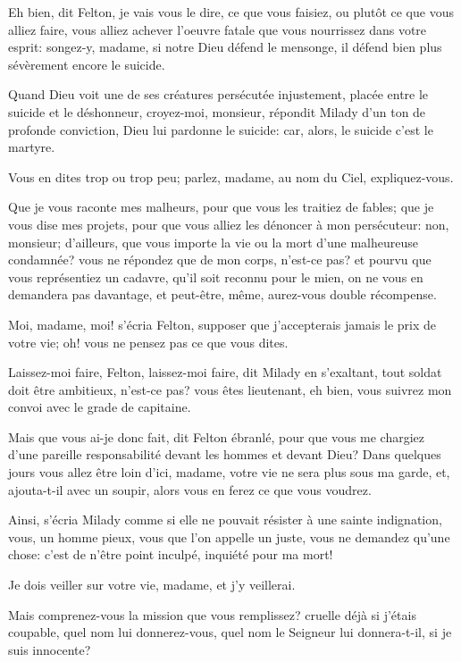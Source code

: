 \speak  Eh bien, dit Felton, je vais vous le dire, ce que vous faisiez, ou plutôt ce que vous alliez faire, vous alliez achever l'oeuvre fatale que vous nourrissez dans votre esprit: songez-y, madame, si notre Dieu défend le mensonge, il défend bien plus sévèrement encore le suicide. 

\speak  Quand Dieu voit une de ses créatures persécutée injustement, placée entre le suicide et le déshonneur, croyez-moi, monsieur, répondit Milady d'un ton de profonde conviction, Dieu lui pardonne le suicide: car, alors, le suicide c'est le martyre. 

\speak  Vous en dites trop ou trop peu; parlez, madame, au nom du Ciel, expliquez-vous. 

\speak  Que je vous raconte mes malheurs, pour que vous les traitiez de fables; que je vous dise mes projets, pour que vous alliez les dénoncer à mon persécuteur: non, monsieur; d'ailleurs, que vous importe la vie ou la mort d'une malheureuse condamnée? vous ne répondez que de mon corps, n'est-ce pas? et pourvu que vous représentiez un cadavre, qu'il soit reconnu pour le mien, on ne vous en demandera pas davantage, et peut-être, même, aurez-vous double récompense. 

\speak  Moi, madame, moi! s'écria Felton, supposer que j'accepterais jamais le prix de votre vie; oh! vous ne pensez pas ce que vous dites. 

\speak  Laissez-moi faire, Felton, laissez-moi faire, dit Milady en s'exaltant, tout soldat doit être ambitieux, n'est-ce pas? vous êtes lieutenant, eh bien, vous suivrez mon convoi avec le grade de capitaine. 

\speak  Mais que vous ai-je donc fait, dit Felton ébranlé, pour que vous me chargiez d'une pareille responsabilité devant les hommes et devant Dieu? Dans quelques jours vous allez être loin d'ici, madame, votre vie ne sera plus sous ma garde, et, ajouta-t-il avec un soupir, alors vous en ferez ce que vous voudrez. 

\speak  Ainsi, s'écria Milady comme si elle ne pouvait résister à une sainte indignation, vous, un homme pieux, vous que l'on appelle un juste, vous ne demandez qu'une chose: c'est de n'être point inculpé, inquiété pour ma mort! 

\speak  Je dois veiller sur votre vie, madame, et j'y veillerai. 

\speak  Mais comprenez-vous la mission que vous remplissez? cruelle déjà si j'étais coupable, quel nom lui donnerez-vous, quel nom le Seigneur lui donnera-t-il, si je suis innocente? 

